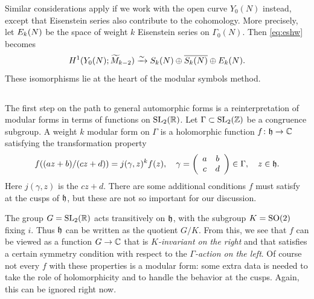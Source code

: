 Similar considerations apply if we work with the open curve $Y_{0}
(N)$ instead, except that Eisenstein series also contribute to the
cohomology.  More precisely, let $E_{k} (N)$ be the space of weight
$k$ Eisenstein series on $\Gamma_{0} (N)$.  Then \eqref{eq:eshw}
becomes
\begin{equation}\label{eq:eseis}
H^{1} (Y_{0} (N); \widetilde{M}_{k-2})\xrightarrow{\sim} S_{k} (N)\oplus
\overline{S_{k} (N)}\oplus E_{k} (N).  
\end{equation}
These isomorphisms lie at the heart of the modular symbols method.

\subsection{}\label{ss:pre.aut.forms}
%
The first step on the path to general automorphic forms is a
reinterpretation of modular forms in terms of functions on $\operatorname{SL}_{2}
(\mathbb{R})$.  Let $\Gamma \subset \operatorname{SL}_{2}
(\mathbb{Z})$ be a congruence subgroup.  A weight $k$ modular form on $\Gamma$
is a holomorphic function $f\colon \mathfrak h \rightarrow \mathbb{C}$ satisfying
the transformation property
\[
f ((az+b)/ (cz+d)) = j (\gamma, z)^{k}f (z), \quad \gamma = \left(\begin{array}{cc}
a&b\\
c&d
\end{array} \right)\in \Gamma, \quad z \in \mathfrak h.
\]  
Here $j (\gamma , z)$ is the  $cz+d$.  There
are some additional conditions $f$ must satisfy at the cusps of $\mathfrak h
$, but these are not so important for our discussion.

The group $G=\operatorname{SL}_{2} (\mathbb{R})$ acts transitively on $\mathfrak h$, with the
subgroup $K=\operatorname{SO} (2)$ fixing $i$.  Thus $\mathfrak h$ can be written as the
quotient $G/K$.  From this, we see that $f$ can be viewed as a function
$G\rightarrow \mathbb{C}$ that is \emph{$K$-invariant on the right} and that
satisfies a certain symmetry condition with respect to the
\emph{$\Gamma$-action on the left}.  Of course not every $f$ with these
properties is a modular form: some extra data is needed to take the
role of holomorphicity and to handle the behavior at the cusps.
Again, this can be ignored right now.

